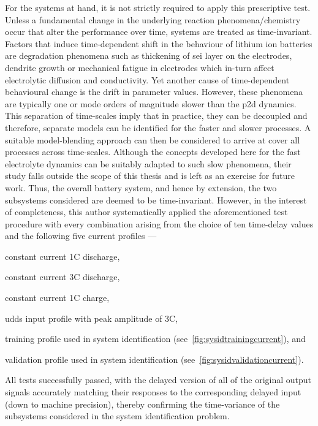 For  the  systems   at  hand,  it  is  not  strictly   required  to  apply  this
prescriptive  test.  Unless a  fundamental  change  in the  underlying  reaction
phenomena/chemistry  occur that  alter the  performance over  time, systems  are
treated  as time-invariant.  Factors  that induce  time-dependent  shift in  the
behaviour of lithium ion batteries  are degradation phenomena such as thickening
of \gls{sei} layer  on the electrodes, dendrite growth or  mechanical fatigue in
electrodes  which in-turn  affect electrolytic  diffusion and  conductivity. Yet
another cause  of time-dependent  behavioural change is  the drift  in parameter
values. However, these  phenomena are typically one or mode  orders of magnitude
slower than  the \gls{p2d} dynamics.  This separation of
time-scales  imply  that in  practice,  they  can  be decoupled  and  therefore,
separate  models can  be  identified  for the  faster  and  slower processes.  A
suitable model-blending approach  can then be considered to arrive  at cover all
processes across time-scales. Although the  concepts developed here for the fast
electrolyte dynamics can be suitably adapted to such slow phenomena, their study
falls outside  the scope of this  thesis and is  left as an exercise  for future
work.  Thus,  the overall  battery  system,  and  hence  by extension,  the  two
subsystems considered are deemed to  be time-invariant. However, in the interest
of  completeness, this  author  systematically applied  the aforementioned  test
procedure  with every  combination arising  from  the choice  of ten  time-delay
values and the following five current profiles ---
\begin{enumerate*}[label=\emph{\alph*})]
    \item constant current 1C discharge,
    \item constant current 3C discharge,
    \item constant current 1C charge,
    \item \gls{udds} input profile with peak amplitude of 3C,
    \item training profile used in system identification (see~\cref{fig:sysidtrainingcurrent}), and
    \item validation profile used in system identification (see~\cref{fig:sysidvalidationcurrent}).
\end{enumerate*}
All tests successfully  passed, with the delayed version of  all of the original
output signals accurately matching their  responses to the corresponding delayed
input (down to  machine precision), thereby confirming the  time-variance of the
subsystems considered in the system identification problem.


